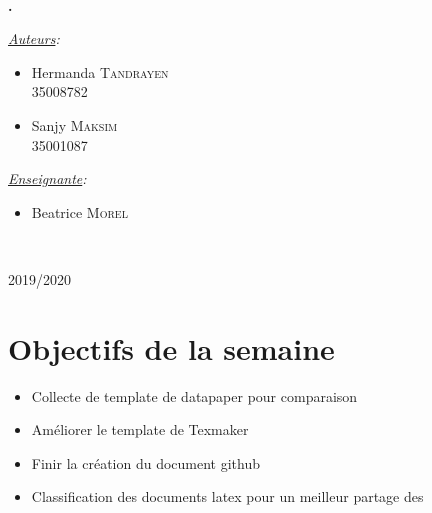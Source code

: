\documentclass[11pt,oneside]{article}
\begin{document}
\begin{titlepage}
\phantom{aaaaaaaaaaaaaaaaaaaaaaaaaaaaaaaaaaaaaaa
ytrfdytfugvghikuhjbiujbhaaaaaaaaaaaaaaa}
\center
\fbox{\begin{minipage}[t][1cm][c]{8cm}
\begin{center}
{\huge \bfseries \textcolor{Rapport}{Feuille de Route}}
\end{center}
\end{minipage}}\\[0.5cm]
\textbf{\Large \color{Mulberry} .}\\[0.5cm] 
\begin{minipage}{0.5\textwidth}
\begin{flushleft} \large
\hspace{0.22\textwidth}\emph{\underline{Auteurs}:}\\
\begin{multicols}{2}
\begin{itemize}[font=\color{airforceblue} \Large, label=, leftmargin=0cm]
\item{Hermanda \textsc{Tandrayen} \\ {\small{35008782}}}
\item{Sanjy \textsc{Maksim} \\ {\small{35001087}}}
\end{itemize}
\end{multicols}
\end{flushleft}
\end{minipage}
\begin{minipage}{0.45\textwidth}
\begin{flushright} \large
\emph{\underline{Enseignante}:}\phantom{aaaaa}\\
\begin{itemize}[font=\color{amber} \Large, label=, leftmargin=3.5cm]
\item{Beatrice \textsc{Morel}}
\end{itemize}
\end{flushright}
\end{minipage}\\[0cm]
\vspace{10cm} 
\begin{center}
2019/2020
\end{center}
\vfill
\end{titlepage}


\newpage
\part*{Objectifs de la semaine}
\begin{itemize}
	\item Collecte de template de datapaper pour comparaison
	\item Améliorer le template de Texmaker
	\item Finir la création du document github 
	\item Classification des documents latex pour un meilleur partage des
\end{itemize}
\end{document}
